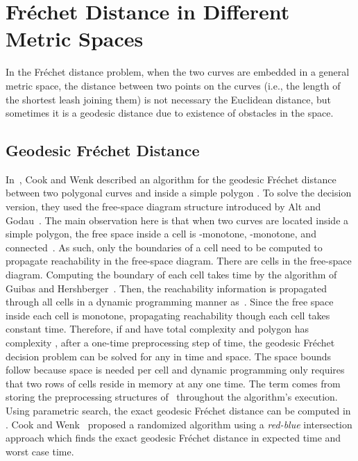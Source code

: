 \documentclass[12pt]{dalthesis}
\newcommand{\Frechet}{Fr\'echet }
\begin{document}
\section{\Frechet Distance in Different Metric Spaces}

In the \Frechet distance problem,
when the two curves are embedded in a general metric space, 
the distance between two points on the curves 
(i.e., the length of the shortest leash joining them) 
is not necessary the Euclidean distance, but sometimes it is a geodesic distance
due to existence of obstacles in the space.


\subsection{Geodesic \Frechet Distance}
In~\cite{WenkC08a}, Cook and Wenk  described an algorithm for the geodesic
\Frechet distance between two polygonal curves  and  
inside a simple polygon . 
To solve the decision version, they used the free-space diagram 
structure introduced by Alt and Godau~\cite{AltG95}. 
The main observation here is that when two curves are located inside a 
simple polygon, the free space inside a cell is -monotone, -monotone, 
and connected~\cite{WenkC08a}. As such, only the boundaries of 
a cell need to be computed to propagate reachability 
in the free-space diagram.
There are  cells in the free-space diagram. 
Computing the boundary of each cell takes  time by the algorithm of Guibas 
and Hershberger~\cite{Guibas86}. 
Then, the reachability information is 
propagated through all cells in a dynamic programming manner as~\cite{AltG95}. 
Since the free space inside each cell is monotone, 
propagating reachability though each cell takes constant time. Therefore, 
if  and  have total complexity  and polygon  has complexity , 
after a one-time preprocessing step of  time, the geodesic \Frechet decision
problem can be solved for
any   in  time and  space.
The space bounds follow because  space is needed per cell
and dynamic programming only requires that two rows of cells reside
in memory at any one time. The  term comes from storing the
preprocessing structures of~\cite{Guibas86} throughout the algorithm's execution.
Using parametric search, the exact 
geodesic \Frechet distance can be computed in 
. 
Cook and Wenk~\cite{WenkC08a} proposed a randomized algorithm using 
a {\em red-blue } intersection approach which  
finds the exact geodesic \Frechet distance in 
 expected time and  worst case
time.
\end{document}
